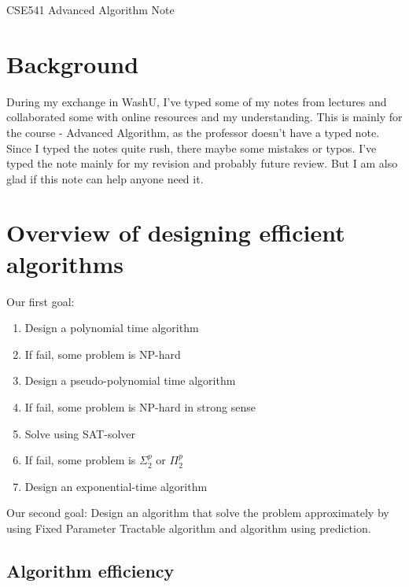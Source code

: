 \documentclass[12pt]{article}
\begin{document}

\begin{center}
    \Large CSE541 Advanced Algorithm Note
\end{center}

\section{Background}

During my exchange in WashU, I've typed some of my notes from lectures and collaborated some with online resources and my understanding. This is mainly for the course - Advanced Algorithm, as the professor doesn't have a typed note. Since I typed the notes quite rush, there maybe some mistakes or typos. I've typed the note mainly for my revision and probably future review. But I am also glad if this note can help anyone need it.

\section{Overview of designing efficient algorithms}

Our first goal:

\begin{enumerate}
    \item Design a polynomial time algorithm
    \item If fail, some problem is NP-hard
    \item Design a pseudo-polynomial time algorithm
    \item If fail, some problem is NP-hard in strong sense
    \item Solve using SAT-solver
    \item If fail, some problem is $\Sigma_2^p$ or $\Pi_2^p$
    \item Design an exponential-time algorithm
\end{enumerate}
\noindent Our second goal: Design an algorithm that solve the problem approximately by using Fixed Parameter Tractable algorithm and algorithm using prediction.

\subsection{Algorithm efficiency}
\end{document}
